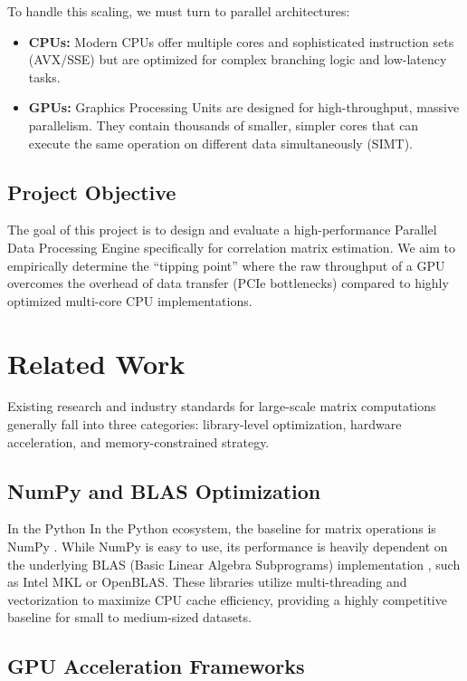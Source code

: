 To handle this scaling, we must turn to parallel architectures:

\begin{itemize}
    \item \textbf{CPUs:} Modern CPUs offer multiple cores and sophisticated instruction sets (AVX/SSE) but are optimized for complex branching logic and low-latency tasks.
    \item \textbf{GPUs:} Graphics Processing Units are designed for high-throughput, massive parallelism. They contain thousands of smaller, simpler cores that can execute the same operation on different data simultaneously (SIMT).
\end{itemize}

\subsection{Project Objective}

The goal of this project is to design and evaluate a high-performance Parallel Data Processing Engine specifically for correlation matrix estimation. We aim to empirically determine the ``tipping point'' where the raw throughput of a GPU overcomes the overhead of data transfer (PCIe bottlenecks) compared to highly optimized multi-core CPU implementations.

\section{Related Work}

Existing research and industry standards for large-scale matrix computations generally fall into three categories: library-level optimization, hardware acceleration, and memory-constrained strategy.

\subsection{NumPy and BLAS Optimization}

In the Python In the Python ecosystem, the baseline for matrix operations is NumPy \cite{harris2020numpy}. While NumPy is easy to use, its performance is heavily dependent on the underlying BLAS (Basic Linear Algebra Subprograms) implementation \cite{anderson1999lapack}, such as Intel MKL or OpenBLAS. These libraries utilize multi-threading and vectorization to maximize CPU cache efficiency, providing a highly competitive baseline for small to medium-sized datasets.

\subsection{GPU Acceleration Frameworks}

